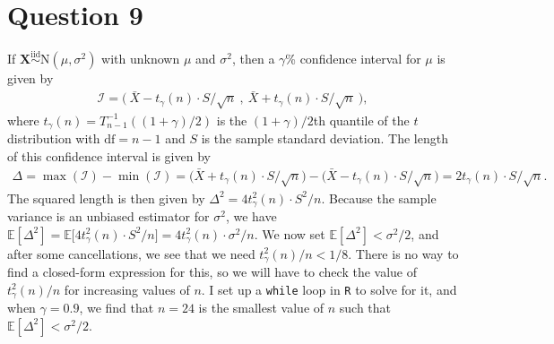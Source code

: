 \documentclass[10pt]{article}
\begin{document}
\section{Question 9} \noindent
If \(\bm{X} \overset{\mathrm{iid}}{\sim} \mathrm{N}(\mu, \sigma^2)\) with unknown \(\mu\) and \(\sigma^2\), then a \(\gamma\)\%{} confidence interval
for \(\mu\) is given by 
\begin{align*}
    \mathcal{I} = \Big( ~\bar{X} - t_{\gamma}(n) \cdot S / \sqrt{n} ~,~ \bar{X} + t_{\gamma}(n) \cdot S / \sqrt{n} ~ \Big),
\end{align*}
where \(t_{\gamma}(n) = T_{n-1}^{-1} ( (1 + \gamma) / 2 )\) is the \((1 + \gamma) / 2\)th quantile of the \(t\) distribution with \(\mathrm{df} = n-1\) and \(S\)
is the sample standard deviation. 
The length of this confidence interval is given by 
\begin{align*}
    \Delta 
    = \max (\mathcal{I}) - \min (\mathcal{I})
    = \Big( \bar{X} + t_{\gamma}(n) \cdot S / \sqrt{n} \Big) - \Big( \bar{X} - t_{\gamma}(n) \cdot S / \sqrt{n} \Big)
    = 2 t_{\gamma}(n) \cdot S / \sqrt{n}.
\end{align*}
The squared length is then given by \(\Delta^2 = 4 t_{\gamma}^2(n) \cdot S^2 / n\). 
Because the sample variance is an unbiased estimator for \(\sigma^2\), we have \(\mathbb{E}[\Delta^2] = \mathbb{E} \big[ 4 t_{\gamma}^2(n) \cdot S^2 / n \big] = 4 t_{\gamma}^2(n) \cdot \sigma^2 / n\).
We now set \(\mathbb{E}[\Delta^2] < \sigma^2 / 2\), and after some cancellations, we see that we need \(t_{\gamma}^2(n) / n < 1/8\). There is no way to find a
closed-form expression for this, so we will have to check the value of \(t_{\gamma}^2(n) / n\) for increasing values of \(n\). I set up a \texttt{while} 
loop in \texttt{R} to solve for it, and when \(\gamma = 0.9\), we find that \(n = 24\) is the smallest value of \(n\) such that \(\mathbb{E}[\Delta^2] < \sigma^2 / 2\).

\end{document}
